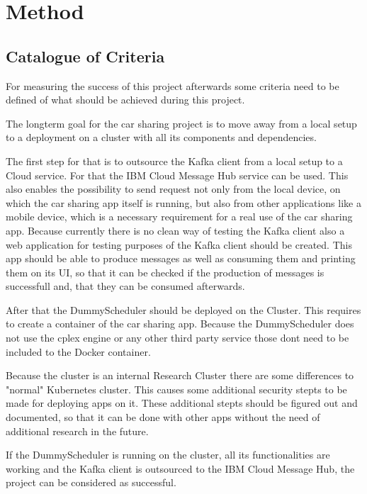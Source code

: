 
\chapter{Method}

\section{Catalogue of Criteria}

For measuring the success of this project afterwards some criteria need to be defined of what should be achieved during this project.

The longterm goal for the car sharing project is to move away from a local setup to a deployment on a cluster with all its components and dependencies.

The first step for that is to outsource the Kafka client from a local setup to a Cloud service. For that the IBM Cloud Message Hub service can be used. This also enables the possibility to send request not only from the local device, on which the car sharing app itself is running, but also from other applications like a mobile device, which is a necessary requirement for a real use of the car sharing app. Because currently there is no clean way of testing the Kafka client also a web application for testing purposes of the Kafka client should be created. This app should be able to produce messages as well as consuming them and printing them on its UI, so that it can be checked if the production of messages is successfull and, that they can be consumed afterwards.

After that the DummyScheduler should be deployed on the Cluster. This requires to create a container of the car sharing app. Because the DummyScheduler does not use the cplex engine or any other third party service those dont need to be included to the Docker container.

Because the cluster is an internal Research Cluster there are some differences to "normal" Kubernetes cluster. This causes some additional security stepts to be made for deploying apps on it. These additional stepts should be figured out and documented, so that it can be done with other apps without the need of additional research in the future.

If the DummyScheduler is running on the cluster, all its functionalities are working and the Kafka client is outsourced to the IBM Cloud Message Hub, the project can be considered as successful.

